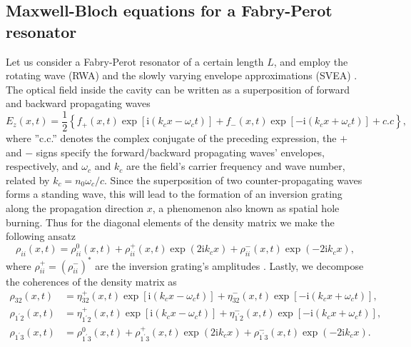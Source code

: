 \documentclass[10pt,letterpaper]{article}%
\begin{document}
\subsection{Maxwell-Bloch equations for a Fabry-Perot resonator}
\label{sec:MBFP}

\label{subsec:mbforfpresonator} Let us consider a Fabry-Perot resonator of a
certain length $L$, and employ the rotating wave (RWA) and the slowly varying
envelope approximations (SVEA) \cite{boyd2003nonlinear,gordon2008multimode}.
The optical field inside the cavity can be written as a superposition of
forward and backward propagating waves
\begin{equation}
E_{z}(x,t)=\frac{1}{2}\left\{  f_{+}(x,t)\exp\left [  \mathrm{i}(k_{c}%
x-\omega_{c}t)\right ]  +f_{-}(x,t)\exp\left [ -\mathrm{i}(k_{c}x+\omega
_{c}t)\right ]  +c.c\right\}  , \label{eq:e-ansatz}%
\end{equation}
where ''c.c.'' denotes the complex conjugate of the preceding expression, the
$+$ and $-$ signs specify the forward/backward propagating waves' envelopes,
respectively, and $\omega_{c}$ and $k_{c}$ are the field's carrier frequency
and wave number, related by $k_{c}=n_{0}\omega_{c}/c$. Since the superposition
of two counter-propagating waves forms a standing wave, this will lead to the
formation of an inversion grating along the propagation direction $x$, a
phenomenon also known as spatial hole burning. Thus for the diagonal elements
of the density matrix we make the following ansatz
\begin{equation}
\rho_{ii}(x,t)=\rho_{ii}^{0}(x,t)+\rho_{ii}^{+}(x,t)\exp\left(  2\mathrm{i}%
k_{c}x\right)  +\rho_{ii}^{-}(x,t)\exp\left(  -2\mathrm{i}k_{c}x\right)  ,
\label{eq:ii-ansatz}%
\end{equation}
where $\rho_{ii}^{+}=(\rho_{ii}^{-})^{\ast}$ are the inversion grating's
amplitudes \cite{wang2007coherent}. Lastly, we decompose the coherences of the
density matrix as 
\begin{subequations}
	\label{eq:cohansatz}%
	\begin{align}
	\rho_{32}(x,t)  &  =\eta_{32}^{+}(x,t)\exp\left[  \mathrm{i}(k_{c}x-\omega
	_{c}t)\right]  +\eta_{32}^{-}(x,t)\exp\left[  -\mathrm{i}(k_{c}x+\omega
	_{c}t)\right]  ,\label{eq:32ansatz}\\
	\rho_{1^{\prime}2}(x,t)  &  =\eta_{1^{\prime}2}^{+}(x,t)\exp\left[
	\mathrm{i}(k_{c}x-\omega_{c}t)\right]  +\eta_{1^{\prime}2}^{-}(x,t)\exp\left[
	-\mathrm{i}(k_{c}x+\omega_{c}t)\right]  ,\label{eq:12ansatz}\\
	\rho_{1^{\prime}3}(x,t)  &  =\rho_{1^{\prime}3}^{0}(x,t)+\rho_{1^{\prime}%
		3}^{+}(x,t)\exp\left(  2\mathrm{i}k_{c}x\right)  +\rho_{1^{\prime}3}%
	^{-}(x,t)\exp\left(  -2\mathrm{i}k_{c}x\right)  . \label{eq:13ansatz}%
	\end{align}
\end{subequations}
\end{document}
